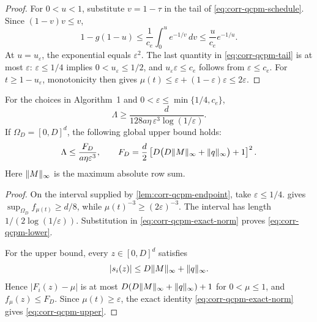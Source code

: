 \begin{proof}
For $0<u<1$, substitute $v=1-\tau$ in the tail of
\eqref{eq:corr-qcpm-schedule}.  Since $(1-v)v\leq v$,
\begin{equation}
 1-g(1-u)
 \leq\frac1{c_e}\int_0^u e^{-1/v}\,dv
 \leq\frac{u}{c_e}e^{-1/u}.                             \label{eq:corr-qcpm-tail}
\end{equation}
At $u=u_\varepsilon$, the exponential equals $\varepsilon^2$.  The last
quantity in \eqref{eq:corr-qcpm-tail} is at most $\varepsilon$:
$\varepsilon\leq1/4$ implies $0<u_\varepsilon\leq1/2$, and
$u_\varepsilon\varepsilon\leq c_e$ follows from $\varepsilon\leq c_e$.
For $t\geq1-u_\varepsilon$,
monotonicity then gives
$\mu(t)\leq\varepsilon+(1-\varepsilon)\varepsilon\leq2\varepsilon$.
\end{proof}

\begin{theorem}
\label{thm:corr-qcpm-norm}
For the choices in Algorithm~1 and
$0<\varepsilon\leq\min\{1/4,c_e\}$,
\begin{equation}
 \boxed{
 \Lambda\geq
 \frac{d}{128a\eta\,\varepsilon^3\log(1/\varepsilon)}.} \label{eq:corr-qcpm-lower}
\end{equation}
If $\Omega_D=[0,D]^d$, the following global upper bound holds:
\begin{equation}
 \Lambda\leq\frac{F_D}{a\eta\varepsilon^3},
 \qquad
 F_D=\frac d2\left[
 D\bigl(D\lVert M\rVert_\infty+\lVert q\rVert_\infty\bigr)+1
 \right]^2.                                             \label{eq:corr-qcpm-upper}
\end{equation}
Here $\lVert M\rVert_\infty$ is the maximum absolute row sum.
\end{theorem}

\begin{proof}
On the interval supplied by \cref{lem:corr-qcpm-endpoint}, take
$\varepsilon\leq1/4$.   gives
$\sup_{\Omega_D} f_{\mu(t)}\geq d/8$, while
$\mu(t)^{-3}\geq(2\varepsilon)^{-3}$.  The interval has length
$1/(2\log(1/\varepsilon))$.  Substitution in
\eqref{eq:corr-qcpm-exact-norm} proves \eqref{eq:corr-qcpm-lower}.

For the upper bound, every $z\in[0,D]^d$ satisfies
\[
 |s_i(z)|\leq D\lVert M\rVert_\infty+\lVert q\rVert_\infty.
\]
Hence $|F_i(z)-\mu|$ is at most
$D(D\lVert M\rVert_\infty+\lVert q\rVert_\infty)+1$ for $0<\mu\leq1$, and
$f_\mu(z)\leq F_D$.  Since $\mu(t)\geq\varepsilon$, the exact identity
\eqref{eq:corr-qcpm-exact-norm} gives \eqref{eq:corr-qcpm-upper}.
\end{proof}

